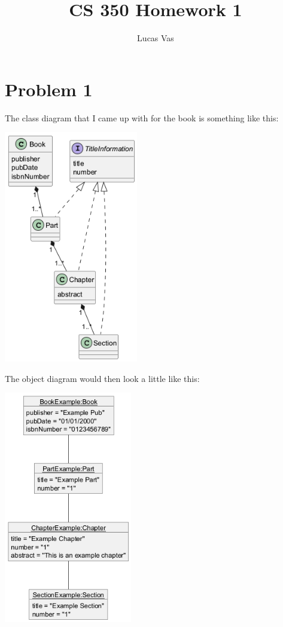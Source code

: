 \documentclass[12pt]{article}
\begin{document}
\title{CS 350 Homework 1}
\author{Lucas Vas}

\maketitle

\section*{Problem 1}

The class diagram that I came up with for the book is something like this:

\begin{center}
	\includegraphics[height=4in]{BookClassDiagram}
\end{center}

\clearpage
The object diagram would then look a little like this:

\begin{center}
	\includegraphics[height=4in]{BookObjectDiagram}
\end{center}
\end{document}
